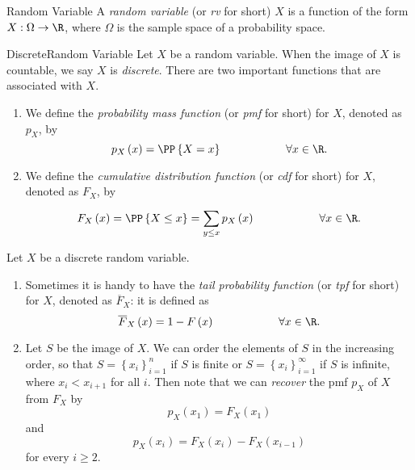 \documentclass[stat333]{subfiles}
\begin{document}
    \begin{definition}{Random Variable}{}
        A \emph{random variable} (or \emph{rv} for short) $X$ is a function of the form $X:\Omega\to\R$, where $\Omega$ is the sample space of a probability space.
    \end{definition}

    \begin{definition}{Discrete}{Random Variable}
        Let $X$ be a random variable. When the image of $X$ is countable, we say $X$ is \emph{discrete}. There are two important functions that are associated with $X$.
        \begin{enumerate}
            \item We define the \emph{probability mass function} (or \emph{pmf} for short) for $X$, denoted as $p_X$, by
                \begin{equation*}
                    p_X\left( x \right) = \PP\left\lbrace X=x \right\rbrace \hspace{2cm}\forall x\in\R.
                \end{equation*}
            \item We define the \emph{cumulative distribution function} (or \emph{cdf} for short) for $X$, denoted as $F_X$, by
                \begin{equation*}
                    F_X\left( x \right) = \PP\left\lbrace X\leq x \right\rbrace = \sum^{}_{y\leq x}p_X\left( x \right) \hspace{2cm}\forall x\in\R. 
                \end{equation*}
        \end{enumerate}
    \end{definition}

    \np Let $X$ be a discrete random variable.
    \begin{enumerate}
        \item Sometimes it is handy to have the \emph{tail probability function} (or \emph{tpf} for short) for $X$, denoted as $\overline{F}_X$: it is defined as
            \begin{equation*}
                \overline{F}_X\left( x \right) = 1-F\left( x \right) \hspace{2cm}\forall x\in\R. 
            \end{equation*}
        \item Let $S$ be the image of $X$. We can order the elements of $S$ in the increasing order, so that $S = \left\lbrace x_i \right\rbrace^{n}_{i=1} $ if $S$ is finite or $S = \left\lbrace x_i \right\rbrace^{\infty}_{i=1}$ if $S$ is infinite, where $x_i < x_{i+1}$ for all $i$. Then note that we can \textit{recover} the pmf $p_X$ of $X$ from $F_X$ by
            \begin{equation*}
                p_X\left( x_1 \right) = F_X\left( x_1 \right) 
            \end{equation*}
            and
            \begin{equation*}
                p_X\left( x_i \right) = F_X\left( x_i \right) - F_X\left( x_{i-1} \right) 
            \end{equation*}
            for every $i\geq 2$.
    \end{enumerate}
    
\end{document}
